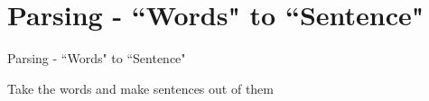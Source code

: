 \section{Parsing - ``Words" to ``Sentence"}
\begin{frame}{Parsing - ``Words" to ``Sentence"}
    \begin{itemize}
        {\LARGE \item[-] Take the words and make sentences out of them}
    \end{itemize}
\end{frame}
